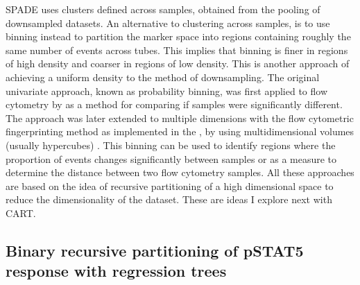 SPADE uses clusters defined across samples, obtained from the pooling of downsampled datasets.
An alternative to clustering across samples, is to use binning instead to partition the marker space into regions containing roughly the same number of
events across tubes. This implies that binning is finer in regions of high density and coarser in regions of low density.
This is another approach of achieving a uniform density to the method of downsampling.
The original univariate approach, known as probability binning, was first applied to flow cytometry by \citet{Roederer:2001tz}
as a method for comparing if samples were significantly different.
The approach was later extended to multiple dimensions with the
flow cytometric fingerprinting method as implemented in
the ,
by using multidimensional volumes (usually hypercubes) \citep{Rogers:2008ij,Rogers:2009ff}.
This binning can be used to identify regions where the proportion of events changes significantly between samples
or as a measure to determine the distance between two flow cytometry samples.
All these approaches are based on the idea of recursive partitioning of a high dimensional space to reduce the dimensionality of the dataset.
These are ideas I explore next with \acrfull{CART}.



\subsection{Binary recursive partitioning of pSTAT5 response with regression trees} 

